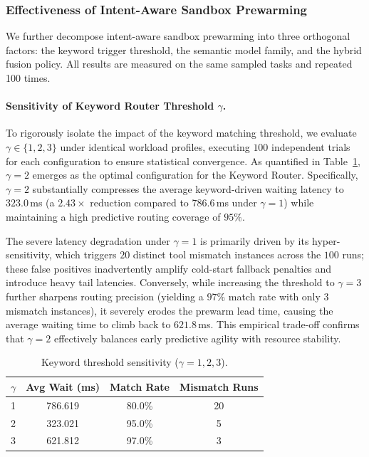 \subsubsection{Effectiveness of Intent-Aware Sandbox Prewarming}

We further decompose intent-aware sandbox prewarming into three orthogonal factors: the keyword trigger threshold, the semantic model family, and the hybrid fusion policy. All results are measured on the same sampled tasks and repeated 100 times.

\paragraph{Sensitivity of Keyword Router Threshold $\gamma$.}
To rigorously isolate the impact of the keyword matching threshold, we evaluate $\gamma\in\{1,2,3\}$ under identical workload profiles, executing $100$ independent 
trials for each configuration to ensure statistical convergence. As quantified in Table~\ref{tab:keyword_k_tradeoff}, $\gamma=2$ emerges as the optimal configuration for the Keyword Router. Specifically, $\gamma=2$ substantially compresses the average keyword-driven waiting latency to $323.0$\,ms (a $2.43\times$ 
reduction compared to $786.6$\,ms under $\gamma=1$) while maintaining a high predictive routing coverage of $95\%$. 

The severe latency degradation under $\gamma=1$ is primarily driven by its hyper-sensitivity, which triggers $20$ distinct tool mismatch instances across the $100$ runs; 
these false positives inadvertently amplify cold-start fallback penalties and introduce heavy tail latencies. Conversely, while increasing the threshold to $\gamma=3$ 
further sharpens routing precision (yielding a $97\%$ match rate with only $3$ mismatch instances), it severely erodes the prewarm lead time, causing the average 
waiting time to climb back to $621.8$\,ms. This empirical trade-off confirms that $\gamma=2$ effectively balances early predictive agility with resource stability.

\begin{table}[t]
\caption{Keyword threshold sensitivity ($\gamma=1,2,3$).}
\label{tab:keyword_k_tradeoff}
\centering
\small
\begin{tabular}{lccc}
\toprule
$\gamma$ & Avg Wait (ms) & Match Rate & Mismatch Runs \\
\midrule
1 & 786.619 & 80.0\% & 20 \\
2 & 323.021 & 95.0\% & 5 \\
3 & 621.812 & 97.0\% & 3 \\
\bottomrule
\end{tabular}
\vspace{-4mm}
\end{table}

